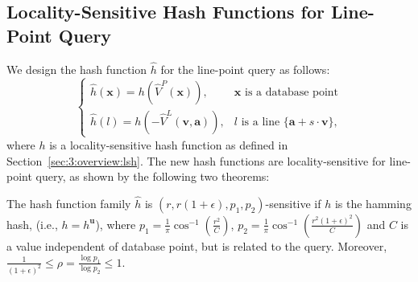 %
%


\subsection{Locality-Sensitive Hash Functions for Line-Point Query}
\label{sec:3:linelsh:lshhash}
We design the hash function $\hat{h}$ for the line-point query as follows:
\begin{equation}
  \label{eq:3:lphash}
  \begin{cases}
    \hat{h}(\mathbf x) = h(\hat{V}^P(\mathbf x)), & \mathbf x \text{ is a database point} \\
    \hat{h}(l) = h(-\hat{V}^L(\mathbf v, \mathbf a)), & l \text{ is a line }\{\mathbf a + s \cdot \mathbf v\},
  \end{cases}
\end{equation}
where $h$ is a locality-sensitive hash function as defined in Section~\ref{sec:3:overview:lsh}. The new hash functions are locality-sensitive for line-point query, as shown by the following two theorems:
\begin{theorem}
  \label{thm:3:hamminghash}
  The hash function family $\hat{h}$ is $(r, r(1+\epsilon), p_1, p_2)$-sensitive if $h$ is the hamming hash, (i.e., $h = h^{\mathbf u}$), where $p_1 = \frac{1}{\pi} \cos^{-1}(\frac{r^2}{C})$, $p_2 = \frac{1}{\pi} \cos^{-1}(\frac{r^2(1+\epsilon)^2}{C})$ and $C$ is a value independent of database point, but is related to the query. Moreover, $\frac{1}{(1+\epsilon)^2} \leq \rho = \frac{\log p_1}{\log p_2} \leq 1$.
\end{theorem}

